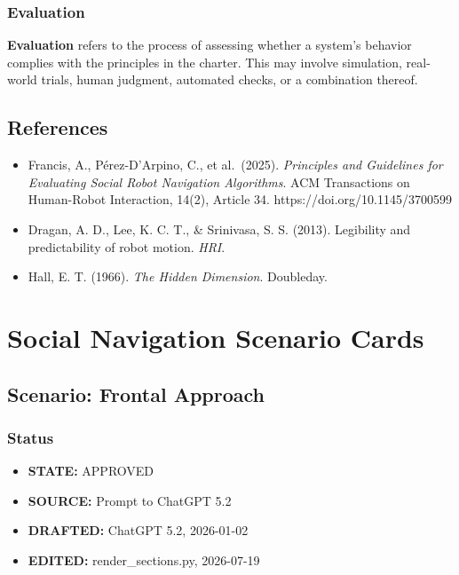 \documentclass[utf8]{frontiers_suppmat} %
\providecommand{\tightlist}{%
  \setlength{\itemsep}{0pt}\setlength{\parskip}{0pt}}
\begin{document}
\subsubsection{Evaluation}\label{evaluation}

\textbf{Evaluation} refers to the process of assessing whether a
system's behavior complies with the principles in the charter. This may
involve simulation, real-world trials, human judgment, automated checks,
or a combination thereof.

\subsection{References}\label{references}

\begin{itemize}
\tightlist
\item
  Francis, A., Pérez-D'Arpino, C., et al.~(2025). \emph{Principles and
  Guidelines for Evaluating Social Robot Navigation Algorithms}. ACM
  Transactions on Human-Robot Interaction, 14(2), Article 34.
  https://doi.org/10.1145/3700599
\item
  Dragan, A. D., Lee, K. C. T., \& Srinivasa, S. S. (2013). Legibility
  and predictability of robot motion. \emph{HRI}.
\item
  Hall, E. T. (1966). \emph{The Hidden Dimension}. Doubleday.
\end{itemize}


\section{Social Navigation Scenario Cards}
\subsection{Scenario: Frontal Approach}\label{scenario-frontal-approach}

\subsubsection{Status}\label{status}

\begin{itemize}
\tightlist
\item
  \textbf{STATE:} APPROVED
\item
  \textbf{SOURCE:} Prompt to ChatGPT 5.2
\item
  \textbf{DRAFTED:} ChatGPT 5.2, 2026-01-02
\item
  \textbf{EDITED:} render\_sections.py, 2026-07-19
\end{itemize}
\end{document}
